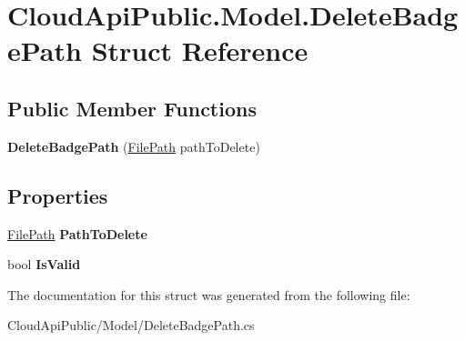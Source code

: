 \hypertarget{struct_cloud_api_public_1_1_model_1_1_delete_badge_path}{\section{Cloud\-Api\-Public.\-Model.\-Delete\-Badge\-Path Struct Reference}
\label{struct_cloud_api_public_1_1_model_1_1_delete_badge_path}
}
\subsection*{Public Member Functions}
\begin{DoxyCompactItemize}
\item 
\hypertarget{struct_cloud_api_public_1_1_model_1_1_delete_badge_path_ad78ad7ddd8409ebf0b44d812a241d10a}{{\bfseries Delete\-Badge\-Path} (\hyperlink{class_cloud_api_public_1_1_model_1_1_file_path}{File\-Path} path\-To\-Delete)}\label{struct_cloud_api_public_1_1_model_1_1_delete_badge_path_ad78ad7ddd8409ebf0b44d812a241d10a}

\end{DoxyCompactItemize}
\subsection*{Properties}
\begin{DoxyCompactItemize}
\item 
\hypertarget{struct_cloud_api_public_1_1_model_1_1_delete_badge_path_abb1fd98cde3390a7f989f528482fdaf3}{\hyperlink{class_cloud_api_public_1_1_model_1_1_file_path}{File\-Path} {\bfseries Path\-To\-Delete}}\label{struct_cloud_api_public_1_1_model_1_1_delete_badge_path_abb1fd98cde3390a7f989f528482fdaf3}

\item 
\hypertarget{struct_cloud_api_public_1_1_model_1_1_delete_badge_path_a0176915338a7dde8d0742fb6d110bb98}{bool {\bfseries Is\-Valid}}\label{struct_cloud_api_public_1_1_model_1_1_delete_badge_path_a0176915338a7dde8d0742fb6d110bb98}

\end{DoxyCompactItemize}


The documentation for this struct was generated from the following file\-:\begin{DoxyCompactItemize}
\item 
Cloud\-Api\-Public/\-Model/Delete\-Badge\-Path.\-cs\end{DoxyCompactItemize}
